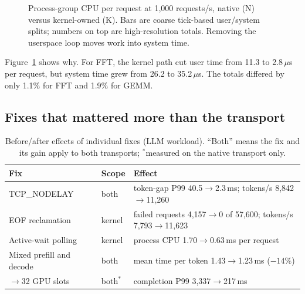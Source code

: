 \documentclass[sigconf,nonacm]{acmart}
\newcommand{\us}{\,$\mu$s}
\begin{document}
\begin{figure}[t]
\centering
{}
\caption{Process-group CPU per request at 1,000 requests/s, native (N) versus
kernel-owned (K). Bars are coarse tick-based user/system splits; numbers on
top are high-resolution totals. Removing the userspace loop moves work into
system time.}
\label{fig:cpu}
\end{figure}

Figure~\ref{fig:cpu} shows why. For FFT, the kernel path cut user time from 11.3 to
2.8\us{} per request, but system time grew from 26.2 to 35.2\us. The totals
differed by only 1.1\% for FFT and 1.9\% for GEMM.

\subsection{Fixes that mattered more than the transport}
\label{sec:fixes}

\begin{table}[t]
\centering
\small
\caption{Before/after effects of individual fixes (LLM workload). ``Both''
means the fix and its gain apply to both transports; $^*$measured on the
native transport only.}
\label{tab:fixes}
\begin{tabular}{@{}>{\raggedright\arraybackslash}p{}l>{\raggedright\arraybackslash}p{}@{}}
\toprule
Fix & Scope & Effect \\
\midrule
TCP\_NODELAY & both & token-gap P99 40.5$\to$2.3\,ms; tokens/s 8,842$\to$11,260 \\
EOF reclamation & kernel & failed requests 4,157$\to$0 of 57,600; tokens/s 7,793$\to$11,623 \\
Active-wait polling & kernel & process CPU 1.70$\to$0.63\,ms per request \\
Mixed prefill and decode~\cite{sarathi} & both & mean time per token 1.43$\to$1.23\,ms ($-14\%$) \\
16$\to$32 GPU slots & both$^*$ & completion P99 3,337$\to$217\,ms \\
\bottomrule
\end{tabular}
\end{table}
\end{document}
